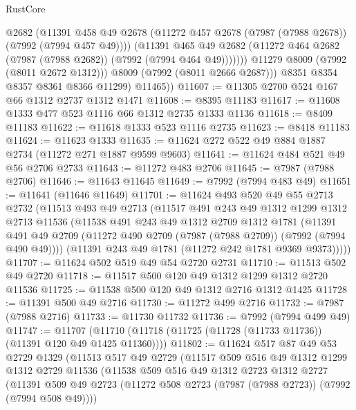 \begin{lexlean}{RustCore}
\begin{coremodule}
                    @2682
                    (@11391
                      @458
                      @49
                      @2678
                      (@11272 @457 @2678 (@7987 (@7988 @2678)) (@7992 (@7994 @457 @49))))
                    (@11391
                      @465
                      @49
                      @2682
                      (@11272 @464 @2682 (@7987 (@7988 @2682)) (@7992 (@7994 @464 @49)))))))
              @11279
              @8009
              (@7992 (@8011 @2672 @1312)))
            @8009
            (@7992 (@8011 @2666 @2687)))
          @8351
          @8354
          @8357
          @8361
          @8366
          @11299)
        @11465))
@11607 := @11305 @2700 @524 @167 @66 @1312 @2737 @1312 @1471
@11608 := @8395 @11183
@11617 := @11608 @1333 @477 @523 @1116 @66 @1312 @2735 @1333 @1136
@11618 := @8409 @11183
@11622 := @11618 @1333 @523 @1116 @2735
@11623 := @8418 @11183
@11624 := @11623 @1333
@11635 := @11624 @272 @522 @49 @884 @1887 @2734 (@11272 @271 @1887 @9599 @9603)
@11641 := @11624 @484 @521 @49 @56 @2706 @2733
@11643 := @11272 @483 @2706
@11645 := @7987 (@7988 @2706)
@11646 := @11643 @11645
@11649 := @7992 (@7994 @483 @49)
@11651 := @11641 (@11646 @11649)
@11701 := @11624
    @493
    @520
    @49
    @55
    @2713
    @2732
    (@11513
      @493
      @49
      @2713
      (@11517
        @491
        @243
        @49
        @1312
        @1299
        @1312
        @2713
        @11536
        (@11538
          @491
          @243
          @49
          @1312
          @2709
          @1312
          @1781
          (@11391 @491 @49 @2709 (@11272 @490 @2709 (@7987 (@7988 @2709)) (@7992 (@7994 @490 @49))))
          (@11391 @243 @49 @1781 (@11272 @242 @1781 @9369 @9373)))))
@11707 := @11624 @502 @519 @49 @54 @2720 @2731
@11710 := @11513 @502 @49 @2720
@11718 := @11517 @500 @120 @49 @1312 @1299 @1312 @2720 @11536
@11725 := @11538 @500 @120 @49 @1312 @2716 @1312 @1425
@11728 := @11391 @500 @49 @2716
@11730 := @11272 @499 @2716
@11732 := @7987 (@7988 @2716)
@11733 := @11730 @11732
@11736 := @7992 (@7994 @499 @49)
@11747 := @11707 (@11710 (@11718 (@11725 (@11728 (@11733 @11736)) (@11391 @120 @49 @1425 @11360))))
@11802 := @11624
    @517
    @87
    @49
    @53
    @2729
    @1329
    (@11513
      @517
      @49
      @2729
      (@11517
        @509
        @516
        @49
        @1312
        @1299
        @1312
        @2729
        @11536
        (@11538
          @509
          @516
          @49
          @1312
          @2723
          @1312
          @2727
          (@11391 @509 @49 @2723 (@11272 @508 @2723 (@7987 (@7988 @2723)) (@7992 (@7994 @508 @49))))

\end{coremodule}
\end{lexlean}
